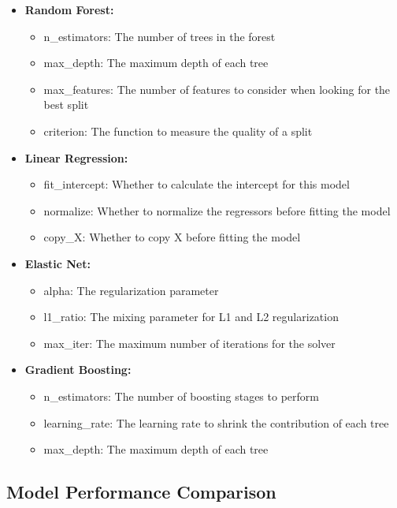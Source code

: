 \documentclass[conference]{IEEEtran}
\begin{document}
\begin{itemize}
\item \textbf{Random Forest:}
\begin{itemize}
\item n\_estimators: The number of trees in the forest
\item max\_depth: The maximum depth of each tree
\item max\_features: The number of features to consider when looking for the best split
\item criterion: The function to measure the quality of a split
\end{itemize}
\item \textbf{Linear Regression:}
\begin{itemize}
    \item fit\_intercept: Whether to calculate the intercept for this model
    \item normalize: Whether to normalize the regressors before fitting the model
    \item copy\_X: Whether to copy X before fitting the model
\end{itemize}

\item \textbf{Elastic Net:}
\begin{itemize}
    \item alpha: The regularization parameter
    \item l1\_ratio: The mixing parameter for L1 and L2 regularization
    \item max\_iter: The maximum number of iterations for the solver
\end{itemize}

\item \textbf{Gradient Boosting:}
\begin{itemize}
    \item n\_estimators: The number of boosting stages to perform
    \item learning\_rate: The learning rate to shrink the contribution of each tree
    \item max\_depth: The maximum depth of each tree
\end{itemize}
\end{itemize}





\subsection{Model Performance Comparison}
\end{document}
